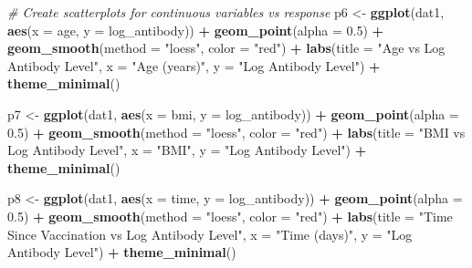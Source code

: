 \documentclass[
]{article}
\newenvironment{Shaded}{\begin{snugshade}}{\end{snugshade}}
\newcommand{\AttributeTok}[1]{\textcolor[rgb]{0.13,0.29,0.53}{#1}}
\newcommand{\CommentTok}[1]{\textcolor[rgb]{0.56,0.35,0.01}{\textit{#1}}}
\newcommand{\FloatTok}[1]{\textcolor[rgb]{0.00,0.00,0.81}{#1}}
\newcommand{\FunctionTok}[1]{\textcolor[rgb]{0.13,0.29,0.53}{\textbf{#1}}}
\newcommand{\NormalTok}[1]{#1}
\newcommand{\OtherTok}[1]{\textcolor[rgb]{0.56,0.35,0.01}{#1}}
\newcommand{\SpecialCharTok}[1]{\textcolor[rgb]{0.81,0.36,0.00}{\textbf{#1}}}
\newcommand{\StringTok}[1]{\textcolor[rgb]{0.31,0.60,0.02}{#1}}
\begin{document}
\begin{Shaded}
\begin{Highlighting}[]
\CommentTok{\# Create scatterplots for continuous variables vs response}
\NormalTok{p6 }\OtherTok{\textless{}{-}} \FunctionTok{ggplot}\NormalTok{(dat1, }\FunctionTok{aes}\NormalTok{(}\AttributeTok{x =}\NormalTok{ age, }\AttributeTok{y =}\NormalTok{ log\_antibody)) }\SpecialCharTok{+}
  \FunctionTok{geom\_point}\NormalTok{(}\AttributeTok{alpha =} \FloatTok{0.5}\NormalTok{) }\SpecialCharTok{+}
  \FunctionTok{geom\_smooth}\NormalTok{(}\AttributeTok{method =} \StringTok{"loess"}\NormalTok{, }\AttributeTok{color =} \StringTok{"red"}\NormalTok{) }\SpecialCharTok{+}
  \FunctionTok{labs}\NormalTok{(}\AttributeTok{title =} \StringTok{"Age vs Log Antibody Level"}\NormalTok{, }
       \AttributeTok{x =} \StringTok{"Age (years)"}\NormalTok{, }\AttributeTok{y =} \StringTok{"Log Antibody Level"}\NormalTok{) }\SpecialCharTok{+}
  \FunctionTok{theme\_minimal}\NormalTok{()}

\NormalTok{p7 }\OtherTok{\textless{}{-}} \FunctionTok{ggplot}\NormalTok{(dat1, }\FunctionTok{aes}\NormalTok{(}\AttributeTok{x =}\NormalTok{ bmi, }\AttributeTok{y =}\NormalTok{ log\_antibody)) }\SpecialCharTok{+}
  \FunctionTok{geom\_point}\NormalTok{(}\AttributeTok{alpha =} \FloatTok{0.5}\NormalTok{) }\SpecialCharTok{+}
  \FunctionTok{geom\_smooth}\NormalTok{(}\AttributeTok{method =} \StringTok{"loess"}\NormalTok{, }\AttributeTok{color =} \StringTok{"red"}\NormalTok{) }\SpecialCharTok{+}
  \FunctionTok{labs}\NormalTok{(}\AttributeTok{title =} \StringTok{"BMI vs Log Antibody Level"}\NormalTok{, }
       \AttributeTok{x =} \StringTok{"BMI"}\NormalTok{, }\AttributeTok{y =} \StringTok{"Log Antibody Level"}\NormalTok{) }\SpecialCharTok{+}
  \FunctionTok{theme\_minimal}\NormalTok{()}

\NormalTok{p8 }\OtherTok{\textless{}{-}} \FunctionTok{ggplot}\NormalTok{(dat1, }\FunctionTok{aes}\NormalTok{(}\AttributeTok{x =}\NormalTok{ time, }\AttributeTok{y =}\NormalTok{ log\_antibody)) }\SpecialCharTok{+}
  \FunctionTok{geom\_point}\NormalTok{(}\AttributeTok{alpha =} \FloatTok{0.5}\NormalTok{) }\SpecialCharTok{+}
  \FunctionTok{geom\_smooth}\NormalTok{(}\AttributeTok{method =} \StringTok{"loess"}\NormalTok{, }\AttributeTok{color =} \StringTok{"red"}\NormalTok{) }\SpecialCharTok{+}
  \FunctionTok{labs}\NormalTok{(}\AttributeTok{title =} \StringTok{"Time Since Vaccination vs Log Antibody Level"}\NormalTok{, }
       \AttributeTok{x =} \StringTok{"Time (days)"}\NormalTok{, }\AttributeTok{y =} \StringTok{"Log Antibody Level"}\NormalTok{) }\SpecialCharTok{+}
  \FunctionTok{theme\_minimal}\NormalTok{()}
\end{Highlighting}
\end{Shaded}
\end{document}
